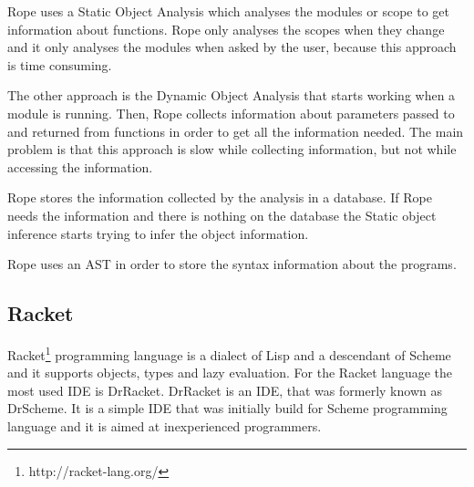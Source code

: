 Rope uses a Static Object Analysis which analyses the modules or scope to get information about functions. 
Rope only analyses the scopes when they change and it only analyses the modules when asked by the user, because this approach is time consuming. 

The other approach is the Dynamic Object Analysis that starts working when a module is running. 
Then, Rope collects information about parameters passed to and returned from functions in order to get all the information needed. 
The main problem is that this approach is slow while collecting information, but not while accessing the information.

Rope stores the information collected by the analysis in a database. 
If Rope needs the information and there is nothing on the database the Static object inference starts trying to infer the object information.

Rope uses an AST in order to store the syntax information about the programs.









\subsection{Racket}

Racket\footnote{http://racket-lang.org/} programming language is a dialect of Lisp and a descendant of Scheme and it supports objects, types and lazy evaluation.
For the Racket language the most used IDE is DrRacket. 
DrRacket is an IDE, that was formerly known as DrScheme. 
It is a simple IDE that was initially build for Scheme programming language and it is aimed at inexperienced programmers.

